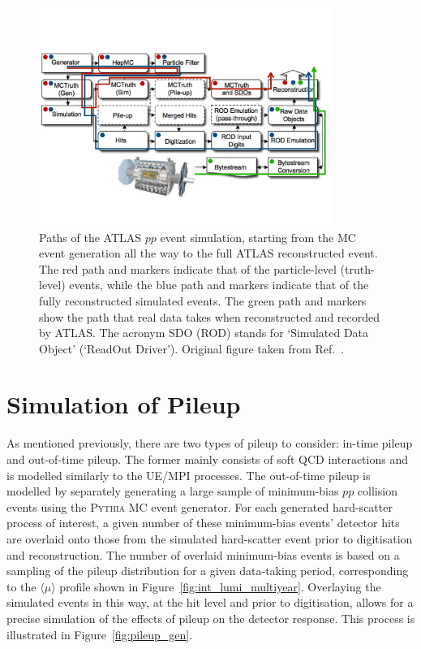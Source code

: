 \begin{figure}[!htb]
    \begin{center}
        \includegraphics[width=0.85\textwidth]{figures/event_simulation/atlas_sim_structure_arrPDF}
        \caption{
            Paths of the ATLAS $pp$ event simulation, starting from the MC event generation all the way
            to the full ATLAS reconstructed event.
            The red path and markers indicate that of the particle-level (truth-level) events,
            while the blue path and markers indicate that of the fully reconstructed simulated events.
            The green path and markers show the path that real data takes when reconstructed and recorded by ATLAS.
            The acronym SDO (ROD) stands for `Simulated Data Object' (`ReadOut Driver').
            Original figure taken from Ref.~\cite{ATLASSim}.
        }
        \label{fig:atlas_sim_structure}
    \end{center}
\end{figure}

\section{Simulation of Pileup}
\label{sec:pileup_sim}

As mentioned previously, there are two types of pileup to consider: in-time pileup and out-of-time pileup.
The former mainly consists of soft QCD interactions and is modelled similarly to the UE/MPI processes.
The out-of-time pileup is modelled by separately generating a large sample of minimum-bias $pp$ collision events
using the \textsc{Pythia} MC event generator.
For each generated hard-scatter process of interest, a given number of these minimum-bias events' detector hits
are overlaid onto those from the simulated hard-scatter event prior to digitisation and reconstruction.
The number of overlaid minimum-bias events is based on a sampling of the pileup distribution for a given
data-taking period, corresponding to the $\langle \mu \rangle$ profile shown in Figure~\ref{fig:int_lumi_multiyear}.
Overlaying the simulated events in this way, at the hit level and prior to digitisation, allows for a precise
simulation of the effects of pileup on the detector response.
This process is illustrated in Figure~\ref{fig:pileup_gen}.

